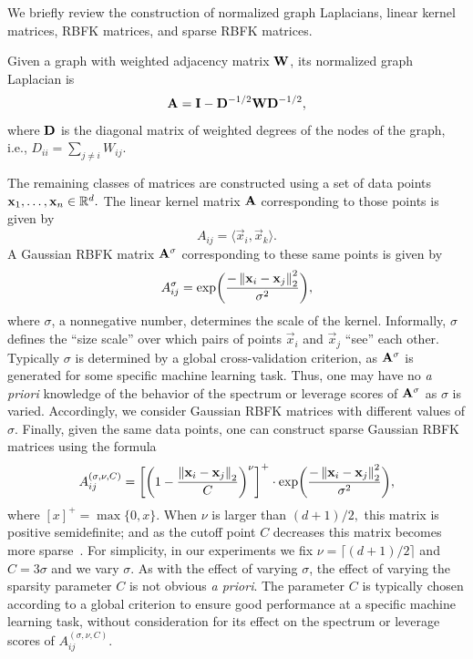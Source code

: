 We briefly review the construction of normalized graph Laplacians, 
linear kernel matrices, RBFK matrices, and sparse RBFK matrices.

Given a graph with weighted adjacency matrix $\mathbf{W}$, its normalized graph Laplacian is 
\[
  \mathbf{A} = \mathbf{I} - \mathbf{D}^{-1/2} \mathbf{W} \mathbf{D}^{-1/2},
\]
where $\mathbf{D}$ is the diagonal matrix of weighted degrees of the nodes of the
graph, i.e., $D_{ii} = \sum_{j \neq i} W_{ij}$.

The remaining classes of matrices are constructed using a set of 
data points $\mathbf{x}_1, \ldots, \mathbf{x}_n \in \mathbb{R}^d.$ The linear kernel 
matrix $\mathbf{A}$ corresponding to those points is given by
\[
 A_{ij} = \langle \vec{x}_i, \vec{x}_k \rangle.
\]
A Gaussian RBFK matrix $\mathbf{A}^\sigma$ corresponding to these same points
is given by
\[
 A_{ij}^\sigma = \mathrm{exp}\bigg(\frac{-\left\|\mathbf{x}_i -
\mathbf{x}_j\right\|_2^2}{\sigma^2}\bigg),
\]
where $\sigma$, a nonnegative number, determines the scale of the kernel.
Informally, $\sigma$ defines the ``size scale'' over which pairs of 
points $\vec{x}_i$ and $\vec{x}_j$ ``see'' each other.
Typically $\sigma$ is determined by a global cross-validation criterion, as 
$\mathbf{A}^\sigma$ is generated for some specific machine learning task. Thus,
one may have no \emph{a priori} knowledge of the behavior of the 
spectrum or leverage scores of $\mathbf{A}^\sigma$ as $\sigma$ is varied. 
Accordingly, we consider Gaussian RBFK matrices with different values of $\sigma$. 
Finally, given the same data points, one
can construct sparse Gaussian RBFK matrices using the formula
\[
 A_{ij}^{(\sigma,\nu,C)} = \left[ \left( 1 - \frac{\left\|\mathbf{x}_i 
 - \mathbf{x}_j\right\|_2}{C}\right)^\nu \right]^+ \cdot \mathrm{exp}\bigg(\frac{-\left\|\mathbf{x}_i -
\mathbf{x}_j\right\|_2^2}{\sigma^2}\bigg),
\]
where $[x]^+ = \max\{0, x\}.$
When $\nu$ is larger than $(d+1)/2,$ this matrix is positive semidefinite; 
and as the cutoff point $C$ decreases this matrix becomes more 
sparse~\cite{Genton02}. 
For simplicity, in our experiments we fix 
$\nu = \lceil (d+1)/2 \rceil$ and $C = 3 \sigma$ and we vary $\sigma$.
As with the effect of varying $\sigma$, the effect of varying the 
sparsity parameter $C$ is not obvious \emph{a priori}. The parameter $C$ is typically chosen
according to a global criterion to ensure good performance at a specific machine learning 
task, without consideration for its effect on the spectrum or leverage 
scores of $A_{ij}^{(\sigma,\nu,C)}$.

